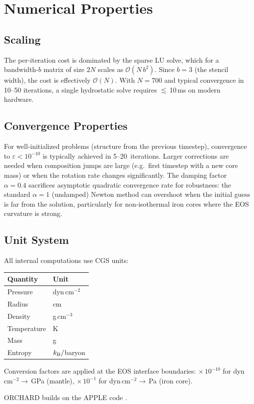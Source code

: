 \documentclass{aastex631}
\begin{document}
\section{Numerical Properties}\label{sec:properties}

\subsection{Scaling}

The per-iteration cost is dominated by the sparse LU solve, which for a
bandwidth-$b$ matrix of size $2N$ scales as $\mathcal{O}(N\,b^2)$.
Since $b = 3$ (the stencil width), the cost is effectively
$\mathcal{O}(N)$.  With $N = 700$ and typical convergence in 10--50
iterations, a single hydrostatic solve requires $\lesssim$\,10\,ms on
modern hardware.

\subsection{Convergence Properties}

For well-initialized problems (structure from the previous timestep),
convergence to $\varepsilon < 10^{-10}$ is typically achieved in
5--20~iterations.  Larger corrections are needed when composition
jumps are large (e.g.\ first timestep with a new core mass) or when
the rotation rate changes significantly.  The damping factor
$\alpha = 0.4$ sacrifices asymptotic quadratic convergence rate for
robustness: the standard $\alpha = 1$ (undamped) Newton method can
overshoot when the initial guess is far from the solution, particularly
for non-isothermal iron cores where the EOS curvature is strong.

\subsection{Unit System}

All internal computations use CGS units:
\begin{center}
\begin{tabular}{ll}
  \hline
  Quantity & Unit \\
  \hline
  Pressure & dyn\,cm$^{-2}$ \\
  Radius & cm \\
  Density & g\,cm$^{-3}$ \\
  Temperature & K \\
  Mass & g \\
  Entropy & $k_{\rm B}/$baryon \\
  \hline
\end{tabular}
\end{center}
Conversion factors are applied at the EOS interface boundaries:
$\times\,10^{-10}$ for dyn\,cm$^{-2}\to$\,GPa (mantle),
$\times\,10^{-1}$ for dyn\,cm$^{-2}\to$\,Pa (iron core).

\begin{acknowledgments}
ORCHARD builds on the APPLE code \citep{Sur2024}.
\end{acknowledgments}



\end{document}
